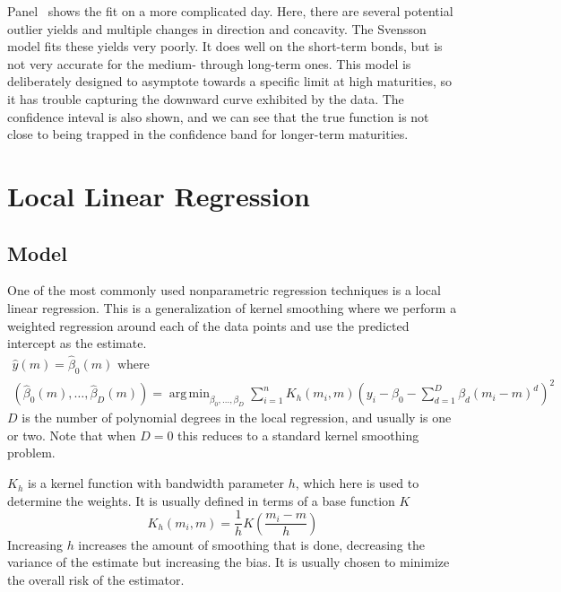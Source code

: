 \documentclass[12pt]{article}
\DeclareMathOperator*{\argmin}{arg\,min}
\begin{document}
Panel~ shows the fit on a more complicated day. Here, there are several potential outlier yields and multiple changes in direction and concavity. The Svensson model fits these yields very poorly. It does well on the short-term bonds, but is not very accurate for the medium- through long-term ones. This model is deliberately designed to asymptote towards a specific limit at high maturities, so it has trouble capturing the downward curve exhibited by the data. The confidence inteval is also shown, and we can see that the true function is not close to being trapped in the confidence band for longer-term maturities.


\section{Local Linear Regression}

\subsection{Model}

One of the most commonly used nonparametric regression techniques is a local linear regression. This is a generalization of kernel smoothing where we perform a weighted regression around each of the data points and use the predicted intercept as the estimate.
\begin{equation}
\begin{gathered}
\hat{y}(m) = \hat{\beta}_0(m) \text{ where}\\
(\hat{\beta}_0(m), \dots, \hat{\beta}_D(m))
    = \argmin_{\beta_0, \dots, \beta_D} \sum_{i=1}^n K_h (m_i, m) \left(
        y_i - \beta_0 - \sum_{d=1}^D \beta_d (m_i - m)^d
    \right)^2
\end{gathered} \label{eq:loclin}
\end{equation}
$D$ is the number of polynomial degrees in the local regression, and usually is one or two. Note that when $D = 0$ this reduces to a standard kernel smoothing problem.

$K_h$ is a kernel function with bandwidth parameter $h$, which here is used to determine the weights. It is usually defined in terms of a base function $K$
\begin{equation}
K_h(m_i, m) = \frac{1}{h} K\left(\frac{m_i - m}{h}\right)
\end{equation}
Increasing $h$ increases the amount of smoothing that is done, decreasing the variance of the estimate but increasing the bias. It is usually chosen to minimize the overall risk of the estimator.
\end{document}
